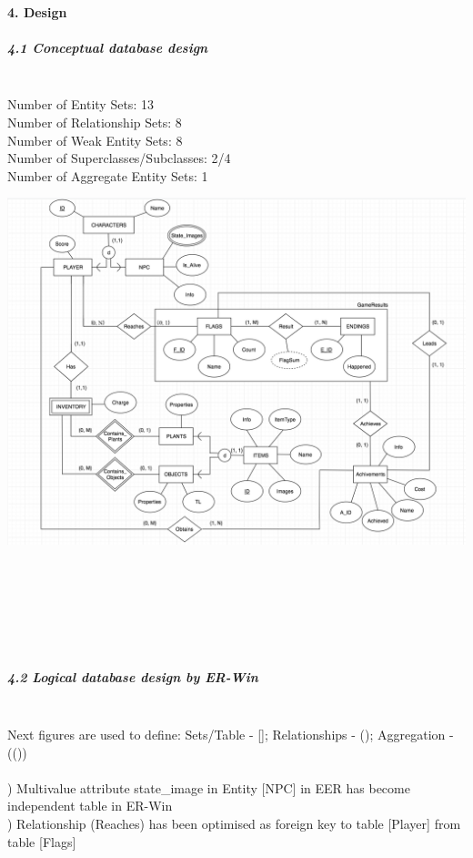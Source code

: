 \documentclass[12pt,a4paper]{article}
\newcommand{\ind}{\indent\indent}
\begin{document}
\paragraph{4. Design\\}
\subparagraph{4.1 Conceptual database design\\}
\ind\\
Number of Entity Sets: 13\\
Number of Relationship Sets: 8\\
Number of Weak Entity Sets: 8\\
Number of Superclasses/Subclasses: 2/4\\
Number of Aggregate Entity Sets: 1\\
\begin{center}
\includegraphics[scale=0.6]{images/Conceptual.png} 
\end{center}
\ind\\
\ind\\
\ind\\
\ind\\
\ind\\
\subparagraph{4.2 Logical database design by ER-Win\\}
\ind\\
Next figures are used to define: Sets/Table - []; Relationships - (); Aggregation - (())\\
\\
\ind 1) Multivalue attribute state\_image in Entity [NPC] in EER has become independent table in ER-Win\\
\ind 2) Relationship (Reaches) has been optimised as foreign key to table [Player] from table [Flags]\\
\end{document}
